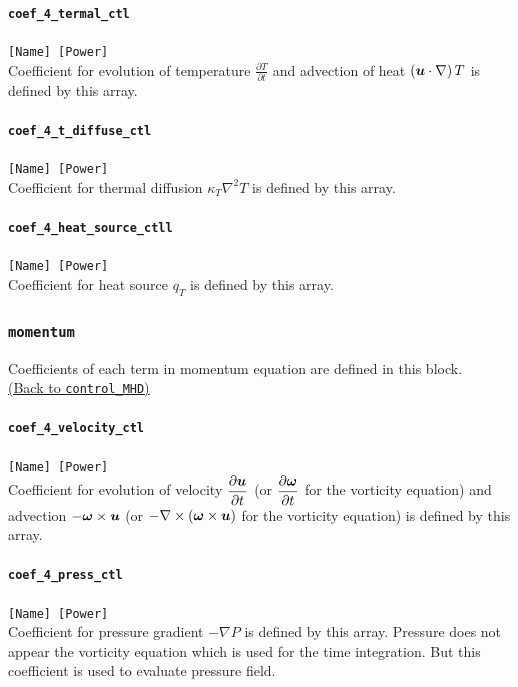 \paragraph{\tt coef\_4\_termal\_ctl}
\label{href_t:coef_4_termal_ctl}
\verb|[Name] [Power]| \\
Coefficient for evolution of temperature $\displaystyle \frac{\partial T}{\partial t}$ and advection of heat $\left(\mbox{\boldmath$u$} \cdot \nabla \right) T$ is defined by this array.

\paragraph{\tt coef\_4\_t\_diffuse\_ctl}
\label{href_t:coef_4_t_diffuse_ctl}
\verb|[Name] [Power]| \\
Coefficient for thermal diffusion $\displaystyle \kappa_{T} \nabla^{2} T$ is defined by this array.

\paragraph{\tt coef\_4\_heat\_source\_ctll}
\label{href_t:coef_4_heat_source_ctl}
\verb|[Name] [Power]| \\
Coefficient for heat source $\displaystyle q_{T}$ is defined by this array.

\subsubsection{\tt momentum}
\label{href_t:momentum}
Coefficients of each term in momentum equation are defined in this block. \\
\hyperref[href_i:momentum]{(Back to {\tt control\_MHD})}

\paragraph{\tt coef\_4\_velocity\_ctl}
\label{href_t:coef_4_velocity_ctl}
\verb|[Name] [Power]| \\
Coefficient for evolution of velocity $\displaystyle \frac{\partial \mbox{\boldmath$u$}}{\partial t}$ (or $\displaystyle \frac{\partial \mbox{\boldmath$\omega$}}{\partial t}$ for the vorticity equation) and advection $-\mbox{\boldmath$\omega$} \times \mbox{\boldmath$u$}$ (or $- \nabla \times \left(\mbox{\boldmath$\omega$} \times \mbox{\boldmath$u$} \right)$ for the vorticity equation) is defined by this array.

\paragraph{\tt coef\_4\_press\_ctl}
\label{href_t:coef_4_press_ctl}
\verb|[Name] [Power]| \\
Coefficient for pressure gradient $-\nabla P$ is defined by this array. Pressure does not appear the vorticity equation which is used for the time integration. But this coefficient is used to evaluate pressure field.

